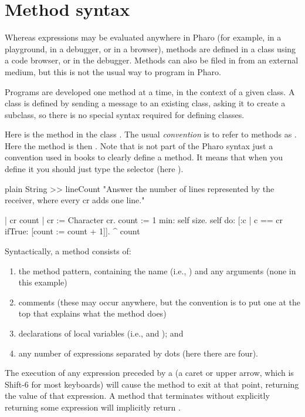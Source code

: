 \documentclass[10pt,twoside,english]{_support/latex/sbabook/sbabook}
\begin{document}
\section{Method syntax}
Whereas expressions may be evaluated anywhere in Pharo (for example, in a
playground, in a debugger, or in a browser), methods are defined in a
 class using a code browser, or in the debugger. Methods can also be filed in from an
external medium, but this is not the usual way to program in Pharo.

Programs are developed one method at a time, in the context of a given class. A
class is defined by sending a message to an existing class, asking it to create
a subclass, so there is no special syntax required for defining classes.

Here is the method  in the class . The usual \textit{convention}
is to refer to methods as . Here the method is then .
Note that  is not part of the Pharo syntax just
a convention used in books to clearly define a method. It means that when you define it you should
 just type the selector (here ). 

\begin{displaycode}{plain}
String >> lineCount
	"Answer the number of lines represented by the receiver, where every cr adds one line."

	| cr count |
	cr := Character cr.
	count := 1 min: self size.
	self do: [:c | c == cr ifTrue: [count := count + 1]].
	^ count
\end{displaycode}

Syntactically, a method consists of:

\begin{enumerate}
\item the method pattern, containing the name (i.e., ) and any arguments (none in this example)
\item comments (these may occur anywhere, but the convention is to put one at the top that explains what the method does)
\item declarations of local variables (i.e.,  and ); and
\item any number of expressions separated by dots (here there are four).
\end{enumerate}

The execution of any expression preceded by a \textcode{\string^} (a caret or upper
arrow, which is Shift-6 for most keyboards) will cause the method to exit at
that point, returning the value of that expression. A method that terminates
without explicitly returning some expression will implicitly return .
\end{document}
